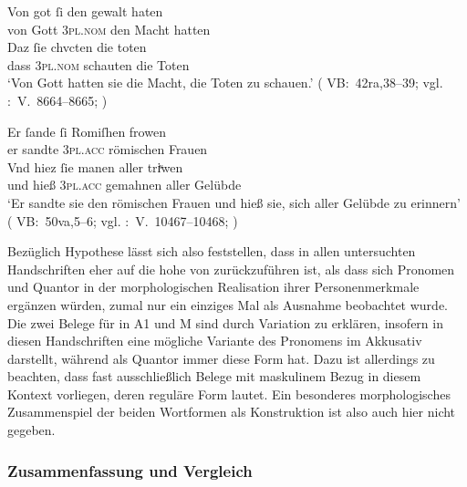 \begin{exe}
\ex \label{ex:vbsisie}
 	\begin{xlist}
 	\ex \gll Von got ſi den gewalt haten \\
		     von Gott \textsc{3pl\subM.nom} den Macht hatten \\
 	\sn \gll Daz ſie chvcten die toten \\
		     dass \textsc{3pl\subM.nom} schauten die Toten \\
		\trans `Von Gott hatten sie  die Macht, die
			Toten zu schauen.'
			(%
				VB:~42ra,38--39; vgl.
				\KC:~V.~8664--8665;
				\cite[241]{schroeder1895}%
			)
 		\label{ex:vbsisie_1}

	\ex \gll Er ſande ſi Romiſhen frowen \\
		     er sandte \textsc{3pl\subI.acc} römischen Frauen \\
	\sn \gll Vnd hiez ſie manen aller triͮwen \\
		     und hieß \textsc{3pl\subF.acc} gemahnen aller Gelübde \\
		\trans `Er sandte sie  den römischen Frauen und
			hieß sie, sich aller Gelübde zu erinnern'
			(%
				VB:~50va,5--6; vgl.
				\KC:~V.~10467--10468;
				\cite[273]{schroeder1895}%
			)
		\label{ex:vbsisie_2}
	\end{xlist}%
\end{exe}

Bezüglich  Hypothese lässt sich also feststellen, dass
 in allen unter\-suchten Handschriften eher auf die hohe
 von  zurückzuführen ist, als dass sich Pro\-nomen und
Quantor in der morphologischen Realisation ihrer Personenmerkmale ergänzen
würden, zumal  nur ein einziges Mal als Ausnahme
beobachtet wurde. Die zwei Belege für  in A1 und M sind durch
Variation zu erklären, insofern  in diesen Handschriften eine
mög\-liche Variante des Pronomens im Akkusativ darstellt, während 
als Quantor immer diese Form hat. Dazu ist allerdings zu beachten, dass fast
ausschließlich Belege mit maskulinem Bezug in diesem Kontext vorliegen, deren
reguläre Form  lautet. Ein besonderes morphologisches Zusammenspiel
der beiden Wortformen als Konstruktion ist also auch hier nicht gegeben.

\subsubsection{Zusammenfassung und Vergleich}
\label{subsubsec:persfeatsmry}


